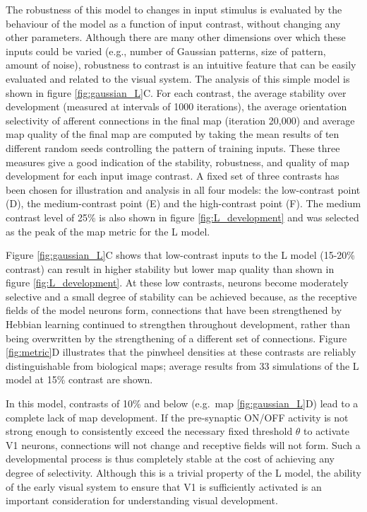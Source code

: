 \documentclass{article}
\begin{document}
The robustness of this model to changes in input stimulus is evaluated
by the behaviour of the model as a function of input contrast, without
changing any other parameters. Although there are many other
dimensions over which these inputs could be varied (e.g., number of
Gaussian patterns, size of pattern, amount of noise), robustness to contrast is an
intuitive feature that can be easily evaluated and related to the
visual system.  The analysis of this simple model
is shown in figure \ref{fig:gaussian_L}C. For each contrast, the
average stability over development (measured at intervals of
1000 iterations), the average orientation
selectivity of afferent connections in the final map (iteration
20,000) and average map quality of the final map are computed by taking
the mean results of ten different random seeds controlling the pattern
of training inputs. These three
measures give a good indication of the stability, robustness, and
quality of map development for each input image contrast. A fixed set
of three contrasts has been chosen for illustration and analysis in all
four models: the low-contrast point (D), the medium-contrast point (E)
and the high-contrast point (F). The medium contrast level of 25\% is
also shown in figure \ref{fig:L_development} and was selected as the peak
of the map metric for the L model.

Figure \ref{fig:gaussian_L}C shows that low-contrast inputs to the L
model (15-20\% contrast) can result in higher stability but lower map
quality than shown in figure \ref{fig:L_development}.  At these low
contrasts, neurons become moderately selective and a small degree of
stability can be achieved because, as the receptive fields of the
model neurons form, connections that have been strengthened by Hebbian
learning continued to strengthen throughout development, rather than
being overwritten by the strengthening of a different set of
connections. Figure \ref{fig:metric}D illustrates that
the pinwheel densities at these contrasts are reliably distinguishable
from biological maps; average results from 33 simulations
of the L model at 15\% contrast are shown.

In this model, contrasts of 10\% and below (e.g.\ map \ref{fig:gaussian_L}D) lead to a
complete lack of map development. If the pre-synaptic ON/OFF activity
is not strong enough to consistently exceed the necessary fixed
threshold $\theta$ to activate V1 neurons, connections will not change
and receptive fields will not form. Such a developmental process is
thus completely stable at the cost of achieving any degree of
selectivity. Although this is a trivial property of the L model, the
ability of the early visual system to ensure that V1 is sufficiently
activated is an important consideration for understanding visual
development.
\end{document}
